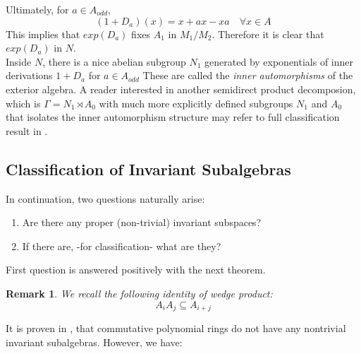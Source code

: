 \documentclass[12pt]{article}
\newtheorem{remark}[theorem]{Remark}
\numberwithin{theorem}{section}
\numberwithin{equation}{theorem}
\begin{document}
    Ultimately, for $a \in A_{odd}$, 
    $$
    (1 + D_a)(x) = x + ax - xa \quad \forall x \in A
    $$
    This implies that $exp(D_a)$ fixes $A_1$ in $M_1/M_2$.
    Therefore it is clear that $exp(D_a)$ in $N$.\\

    Inside $N$, there is a nice abelian subgroup $N_1$ generated by exponentials of inner derivations $1 + D_a$ for $a \in A_{odd}$ These are called the \emph{inner automorphisms} of the exterior algebra. A reader interested in another semidirect product decomposion, which is $\Gamma = N_1 \rtimes A_0$ with much more explicitly defined subgroups $N_1$ and $A_0$ that isolates the inner automorphism structure may refer to full classification result in \cite{djokovic}.

\pagebreak

\subsection{Classification of Invariant Subalgebras}
In continuation, two questions naturally arise: 
\begin{enumerate}
    \item Are there any proper (non-trivial) invariant subspaces?
    \item If there are, -for classification- what are they?
\end{enumerate}
First question is answered positively with the next theorem.

\begin{remark}
    We recall the following identity of wedge product:
    $$A_i A_j \subseteq A_{i + j}$$
\end{remark}

It is proven in \cite{zahra}, that commutative polynomial rings do not have any nontrivial invariant subalgebras. However, we have:
\end{document}
